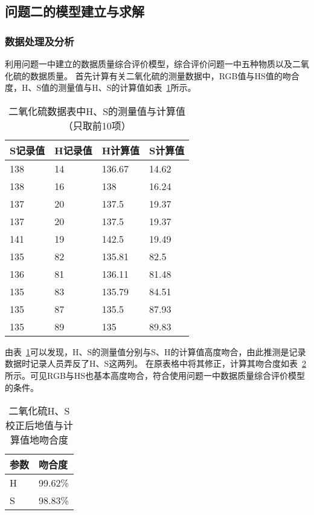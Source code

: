 \subsection{问题二的模型建立与求解}

\subsubsection{数据处理及分析}

利用问题一中建立的数据质量综合评价模型，综合评价问题一中五种物质以及二氧化硫的数据质量。
首先计算有关二氧化硫的测量数据中，RGB值与HS值的吻合度，H、S值的测量值与H、S的计算值如表~\ref{SO2_HSCheck}所示。

\begin{table}[]
    \centering
    \caption{二氧化硫数据表中H、S的测量值与计算值（只取前10项）}
    \label{SO2_HSCheck}
    \begin{tabular}{@{}llll@{}}
    \toprule
    S记录值 & H记录值 & H计算值        & S计算值        \\ \midrule
    138  & 14   & 136.67 & 14.62 \\
    138  & 16   & 138         & 16.24 \\
    137  & 20   & 137.5       & 19.37 \\
    137  & 20   & 137.5       & 19.37 \\
    141  & 19   & 142.5       & 19.49 \\
    135  & 82   & 135.81 & 82.5        \\
    136  & 81   & 136.11 & 81.48 \\
    135  & 83   & 135.79 & 84.51 \\
    135  & 87   & 135.5       & 87.93 \\
    135  & 89   & 135         & 89.83 \\ \bottomrule
    \end{tabular}
    \end{table}

由表~\ref{SO2_HSCheck}可以发现，H、S的测量值分别与S、H的计算值高度吻合，由此推测是记录数据时记录人员弄反了H、S这两列。
在原表格中将其修正，计算其吻合度如表~\ref{SO2_HSMatch}所示。可见RGB与HS也基本高度吻合，符合使用问题一中数据质量综合评价模型的条件。

\begin{table}[]
    \centering
    \caption{二氧化硫H、S校正后地值与计算值地吻合度}
    \label{SO2_HSMatch}
    \begin{tabular}{@{}ll@{}}
    \toprule
    参数 & 吻合度     \\ \midrule
    H  & 99.62\% \\
    S  & 98.83\% \\ \bottomrule
    \end{tabular}
    \end{table}


